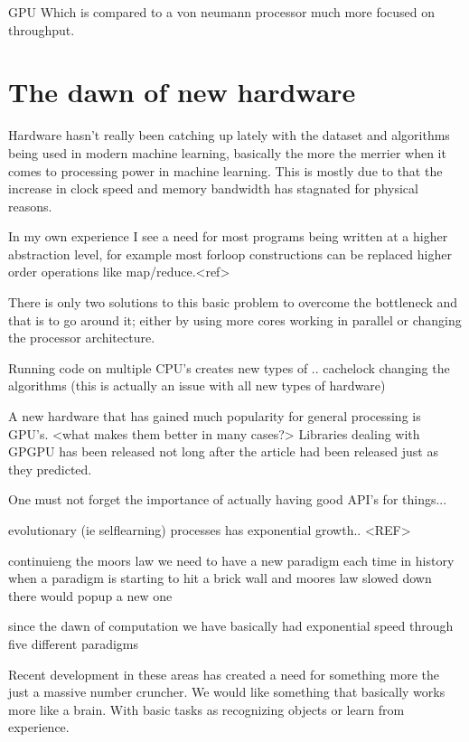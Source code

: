 \documentclass{article}
\begin{document}
GPU Which is compared to a von neumann processor much more focused on throughput.

\section{The dawn of new hardware}

    Hardware hasn't really been catching up lately with the dataset and algorithms
    being used in modern machine learning, basically the more the merrier when it comes
    to processing power in machine learning. This is mostly due to that the
    increase in clock speed and memory bandwidth has stagnated for physical
    reasons.
    
    In my own experience I see a need for most programs being written at
    a higher abstraction level, for example most forloop constructions can be
    replaced higher order operations like map/reduce.<ref> 

    There is only two solutions to this basic problem to overcome the
    bottleneck and that is to go around it; either by using more cores working in
    parallel or changing the processor architecture.

    Running code on multiple CPU's creates new types of .. 
    cachelock
    changing the algorithms (this is actually an issue with all new types of
    hardware)

    A new hardware that has gained much popularity for general processing is
    GPU's. <what makes them better in many cases?> 
    Libraries dealing with GPGPU has been released not long after the
    article\cite{ms2020} had been released just as they predicted.

    One must not forget the importance of actually having good API's for
    things...

evolutionary (ie selflearning) processes has exponential growth.. <REF>

continuieng the moors law we need to have a new paradigm
each time in history when a paradigm is starting to hit a brick wall and
moores law slowed down there would popup a new one

since the dawn of computation we have basically had exponential speed through
five different paradigms


Recent development in these areas has created a need for something more the
just a massive number cruncher. We would like something that basically works
more like a brain. With basic tasks as recognizing objects or learn from
experience.
\cite{synapse}
\end{document}
